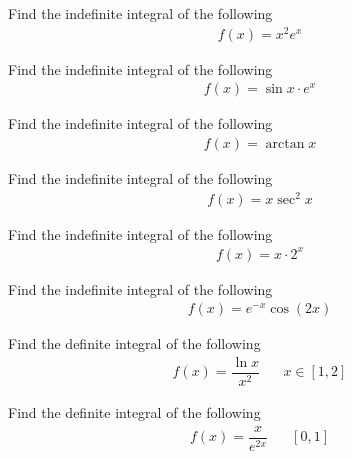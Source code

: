 \begin{exercise}
Find the indefinite integral of the following
\begin{align*}
    f(x) = x^{2} e^{x}
\end{align*}
\end{exercise}

\begin{exercise}
Find the indefinite integral of the following
\begin{align*}
    f(x) = \sin x \cdot e^{x}
\end{align*}
\end{exercise}

\begin{exercise}
Find the indefinite integral of the following
\begin{align*}
    f(x) = \arctan x
\end{align*}
\end{exercise}

\begin{exercise}
Find the indefinite integral of the following
\begin{align*}
    f(x) = x \sec^{2} x
\end{align*}
\end{exercise}

\begin{exercise}
Find the indefinite integral of the following
\begin{align*}
    f(x) = x \cdot 2^{x}
\end{align*}
\end{exercise}

\begin{exercise}
Find the indefinite integral of the following
\begin{align*}
    f(x) = e^{-x} \cos(2x)
\end{align*}
\end{exercise}

\begin{exercise}
Find the definite integral of the following
\begin{align*}
    f(x) = \dfrac{\ln x}{x^{2}} \hspace{20pt} x \in [1, 2]
\end{align*}
\end{exercise}

\begin{exercise}
Find the definite integral of the following
\begin{align*}
    f(x) = \dfrac{x}{e^{2x}} \hspace{20pt} [0, 1]
\end{align*}
\end{exercise}

